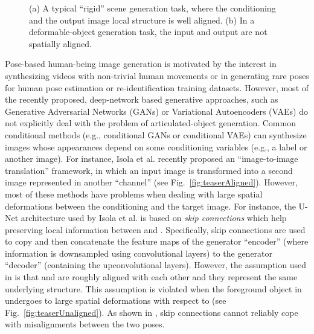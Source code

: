 \documentclass[10pt,twocolumn,letterpaper]{article}
\begin{document}
\begin{figure}[t!]
\centering
{}
\caption{(a) A typical ``rigid'' scene generation task, where the conditioning and the output image local structure is well aligned. (b) In a deformable-object  generation task, the input and output are not spatially aligned.}
\vspace{-0.5cm}
\label{fig:teaser}
\end{figure}

Pose-based human-being image  generation is motivated by the interest in synthesizing videos \cite{Walker2017pose} with non-trivial human movements or in generating rare poses  for human pose estimation \cite{Cao} or re-identification \cite{Zheng_2017_ICCV} training datasets. 
However, most of the recently proposed, deep-network based generative approaches, such as  Generative Adversarial Networks (GANs) \cite{goodfellow2014generative} or Variational Autoencoders (VAEs) 
 \cite{kingma2013auto} do not explicitly deal with the problem of articulated-object generation.
 Common conditional methods (e.g., conditional GANs or conditional VAEs) can synthesize images whose appearances depend on some conditioning variables (e.g., a label or another image). For instance, Isola et al. \cite{pix2pix2016} recently proposed an ``image-to-image translation'' framework, in which an input image  is transformed into a second image  represented in another ``channel'' (see Fig.~\ref{fig:teaserAligned}).
However, most of these methods have problems when dealing with large spatial deformations between the conditioning and the target image. 
For instance, 
the U-Net architecture used by  Isola et al. \cite{pix2pix2016} is based on {\em skip connections} which help preserving local information between  and . 
Specifically, skip connections are used to copy and then concatenate the feature maps of the generator ``encoder'' (where information is downsampled using convolutional layers) to the generator ``decoder'' (containing the upconvolutional layers).
However, the assumption used in \cite{pix2pix2016} is that  and  are roughly aligned with each other and they represent the same underlying structure. This assumption is violated 
when the foreground object in  undergoes to large spatial deformations with respect to  (see Fig.~\ref{fig:teaserUnaligned}). As shown in \cite{ma2017pose},
 skip connections  
cannot reliably cope with misalignments between the two poses.
\end{document}
